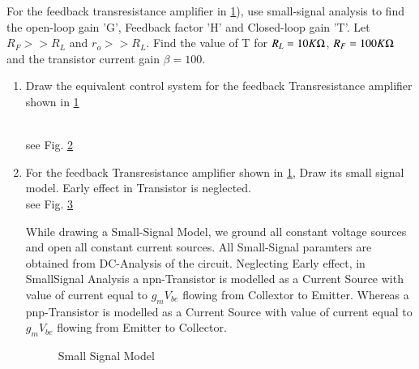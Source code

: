 For the feedback transresistance amplifier in \ref{fig:ee18btech11046_Question}), use small-signal analysis to find the open-loop gain 'G', Feedback factor 'H' and Closed-loop gain 'T'. Let $R_{F}>>R_{L}$ and $r_{o}>>R_{L}$. Find the value of T for $R_{L}=10K\ohm$, $R_{F}=100K\ohm$ and the transistor current gain $\beta = 100$.
\begin{enumerate}[label=\arabic*.,ref=\theenumi]
\item Draw the equivalent control system for the feedback Transresistance amplifier shown in \ref{fig:ee18btech11046_Question}
\renewcommand{\thefigure}{\theenumi.\arabic{figure}}
\begin{figure}[h!]
	\begin{center}
		\resizebox{\columnwidth/1}{!}{}
	\end{center}
	\caption{}
	\label{fig:ee18btech11046_Question}
\end{figure}
\\

%
\solution see Fig. \ref{fig:ee18btech11046_ControlSystem}
\begin{figure}[ht!]
	\begin{center}
		\resizebox{\columnwidth}{!}{}
	\end{center}
	\caption{}
	\label{fig:ee18btech11046_ControlSystem}
\end{figure}
\renewcommand{\thefigure}{\theenumi}

%

\item For the feedback Transresistance amplifier shown in \ref{fig:ee18btech11046_Question}, Draw its small signal model. Early effect in Transistor is neglected.
\\

%
\solution see Fig. \ref {fig:ee18btech11046_smallSig}

While drawing a Small-Signal Model, we
ground all constant voltage sources and open
all constant current sources. All Small-Signal
paramters are obtained from DC-Analysis of
the circuit. Neglecting Early effect, in SmallSignal Analysis a npn-Transistor is modelled as
a Current Source with value of current equal to
$g_{m}V_{be}$ flowing from Collextor to Emitter. Whereas
a pnp-Transistor is modelled as a Current Source
with value of current equal to $g_{m}V_{be}$ flowing
from Emitter to Collector.

\begin{figure}[ht!]
	\begin{center}
		\resizebox{\columnwidth}{!}{}
	\end{center}
	\caption{Small Signal Model}
	\label{fig:ee18btech11046_smallSig}
\end{figure}
\renewcommand{\thefigure}{\theenumi}


\end{enumerate}
